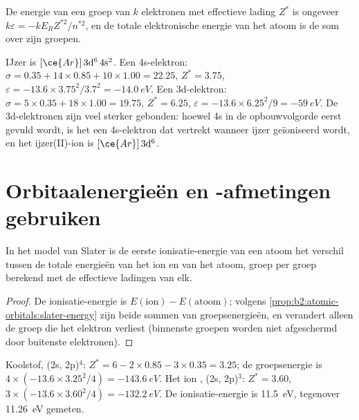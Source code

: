 \begin{proposition}\label{prop:b2:atomic-orbitals:slater-energy}
De energie van een groep van $k$ elektronen met effectieve lading $Z^*$ is ongeveer
$k\varepsilon = -kE_RZ^{*2}/n^{*2}$, en de totale elektronische energie van het atoom
is de som over zijn groepen.
\end{proposition}

\admitted

\begin{example}\label{ex:b2:atomic-orbitals:iron}
IJzer is $[\ce{Ar}]\,3\mathrm d^6\,4\mathrm s^2$. Een 4s-elektron: $\sigma = 0.35 + 14
\times 0.85 + 10 \times 1.00 = 22.25$, $Z^* = 3.75$, $\varepsilon = -13.6 \times
3.75^2/3.7^2 = \qty{-14.0}{eV}$. Een 3d-elektron: $\sigma = 5 \times 0.35 + 18 \times 1.00 =
19.75$, $Z^* = 6.25$, $\varepsilon = -13.6 \times 6.25^2/9 = \qty{-59}{eV}$. De 3d-elektronen
zijn veel sterker gebonden: hoewel 4s in de opbouwvolgorde eerst gevuld wordt,
is het een 4s-elektron dat vertrekt wanneer ijzer geïoniseerd wordt, en het
ijzer(II)-ion is $[\ce{Ar}]\,3\mathrm d^6$.
\end{example}

\section{Orbitaalenergieën en -afmetingen gebruiken}

\begin{proposition}\label{prop:b2:atomic-orbitals:ionisation}
In het model van Slater is de eerste ionisatie-energie van een atoom het verschil
tussen de totale energieën van het ion en van het atoom, groep per groep berekend
met de effectieve ladingen van elk.
\end{proposition}

\begin{proof}
De ionisatie-energie is $E(\text{ion}) - E(\text{atoom})$; volgens
\cref{prop:b2:atomic-orbitals:slater-energy} zijn beide sommen van groepsenergieën, en
verandert alleen de groep die het elektron verliest (binnenste groepen worden niet afgeschermd door
buitenste elektronen).
\end{proof}

\begin{example}[Koolstof]\label{ex:b2:atomic-orbitals:carbon}
Koolstof, (2s, 2p)$^4$: $Z^* = 6 - 2 \times 0.85 - 3 \times 0.35 = 3.25$; de groepsenergie is
$4 \times (-13.6 \times 3.25^2/4) = \qty{-143.6}{eV}$. Het ion , (2s, 2p)$^3$: $Z^* =
3.60$, $3 \times (-13.6 \times 3.60^2/4) = \qty{-132.2}{eV}$. De ionisatie-energie is
\qty{11.5}{eV}, tegenover \qty{11.26}{eV} gemeten.
\end{example}

